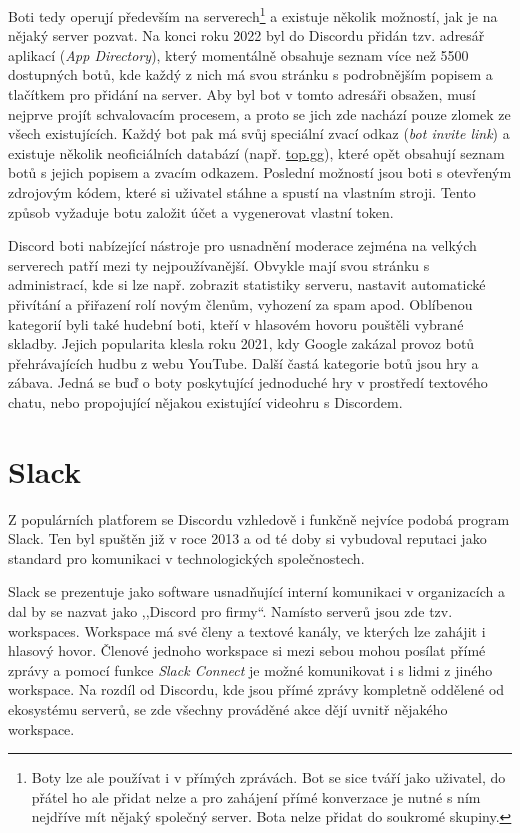 \documentclass[FM]{tulthesis}
\begin{document}
	Boti tedy operují především na serverech\footnote{Boty lze ale používat i v přímých zprávách. Bot se sice tváří jako uživatel, do přátel ho ale přidat nelze a pro zahájení přímé konverzace je nutné s ním nejdříve mít nějaký společný server. Bota nelze přidat do soukromé skupiny.} a existuje několik možností, jak je na nějaký server pozvat. Na konci roku 2022 byl do Discordu přidán tzv. adresář aplikací (\textit{App Directory}), který momentálně obsahuje seznam více než 5500 dostupných botů, kde každý z nich má svou stránku s podrobnějším popisem a tlačítkem pro přidání na server. Aby byl bot v tomto adresáři obsažen, musí nejprve projít schvalovacím procesem, a proto se jich zde nachází pouze zlomek ze všech existujících. Každý bot pak má svůj speciální zvací odkaz (\textit{bot invite link}) a existuje několik neoficiálních databází (např. \href{https://top.gg}{top.gg}), které opět obsahují seznam botů s jejich popisem a zvacím odkazem. Poslední možností jsou boti s otevřeným zdrojovým kódem, které si uživatel stáhne a spustí na vlastním stroji. Tento způsob vyžaduje botu založit účet a vygenerovat vlastní token.
	
	Discord boti nabízející nástroje pro usnadnění moderace zejména na velkých serverech patří mezi ty nejpoužívanější. Obvykle mají svou stránku s administrací, kde si lze např. zobrazit statistiky serveru, nastavit automatické přivítání a přiřazení rolí novým členům, vyhození za spam apod. Oblíbenou kategorií byli také hudební boti, kteří v hlasovém hovoru pouštěli vybrané skladby. Jejich popularita klesla roku 2021, kdy Google zakázal provoz botů přehrávajících hudbu z webu \mbox{YouTube}. Další častá kategorie botů jsou hry a zábava. Jedná se buď o boty poskytující jednoduché hry v prostředí textového chatu, nebo propojující nějakou existující videohru s Discordem.
	
	\section{Slack}
	
	Z populárních platforem se Discordu vzhledově i funkčně nejvíce podobá program Slack. Ten byl spuštěn již v roce 2013 a od té doby si vybudoval reputaci jako standard pro komunikaci v technologických společnostech. \cite{lit_Discord}
	
	Slack se prezentuje jako software usnadňující interní komunikaci v organizacích a dal by se nazvat jako ,,Discord pro firmy``. Namísto serverů jsou zde tzv. workspaces. Workspace má své členy a textové kanály, ve kterých lze zahájit i hlasový hovor. Členové jednoho workspace si mezi sebou mohou posílat přímé zprávy a pomocí funkce \textit{Slack Connect} je možné komunikovat i s lidmi z jiného workspace. Na rozdíl od Discordu, kde jsou přímé zprávy kompletně oddělené od ekosystému serverů, se zde všechny prováděné akce dějí uvnitř nějakého workspace.
	
\end{document}

